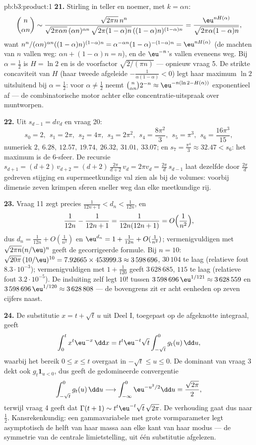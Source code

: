 \begin{solution}{pb:b3:product:1}
\textbf{21.} Stirling in teller en noemer, met $k = \alpha n$:
\[
\binom n{\alpha n} \sim
\frac{\sqrt{2\pi n}\,n^n}
{\sqrt{2\pi\alpha n}\,(\alpha n)^{\alpha n}\,
\sqrt{2\pi(1-\alpha)n}\,((1-\alpha)n)^{(1-\alpha)n}}
= \frac{\eu^{nH(\alpha)}}{\sqrt{2\pi\alpha(1-\alpha)n}},
\]
want $n^n/(\alpha n)^{\alpha n}((1-\alpha)n)^{(1-\alpha)n} =
\alpha^{-\alpha n}(1-\alpha)^{-(1-\alpha)n} = \eu^{nH(\alpha)}$
(de machten van $n$ vallen weg: $\alpha n + (1-\alpha)n = n$), en
de $\eu^{-n}$'s vallen eveneens weg. Bij $\alpha = \frac12$ is $H
= \ln2$ en is de voorfactor $\sqrt{2/(\pi n)}$ --- opnieuw vraag
5. De strikte concaviteit van $H$ (haar tweede afgeleide
$-\frac1{\alpha(1-\alpha)} < 0$) legt haar maximum $\ln 2$
uitsluitend bij $\alpha = \frac12$: voor $\alpha \neq \frac12$
neemt $\binom n{\alpha n}2^{-n} \approx \eu^{-n(\ln2 -
H(\alpha))}$ exponentieel af --- de combinatorische motor achter
elke concentratie-uitspraak over muntworpen.

\textbf{22.} Uit $s_{d-1} = dv_d$ en vraag 20:
\[
s_0 = 2,\ \ s_1 = 2\pi,\ \ s_2 = 4\pi,\ \ s_3 = 2\pi^2,\ \
s_4 = \frac{8\pi^2}3,\ \ s_5 = \pi^3,\ \ s_6 =
\frac{16\pi^3}{15},
\]
numeriek $2,\ 6.28,\ 12.57,\ 19.74,\ 26.32,\ 31.01,\ 33.07$; en
$s_7 = \frac{\pi^4}3 \approx 32.47 < s_6$: het maximum is de
$6$-sfeer. De recursie $s_{d+1} = (d+2)\,v_{d+2} =
(d+2)\,\frac{2\pi}{d+2}\,v_d = 2\pi v_d = \frac{2\pi}d\,s_{d-1}$
laat dezelfde door $\frac{2\pi}d$ gedreven stijging en
supermeetkundige val zien als bij de volumes: voorbij dimensie
zeven krimpen sferen sneller weg dan elke meetkundige rij.

\textbf{23.} Vraag 11 zegt precies $\frac1{12n+1} < d_n <
\frac1{12n}$, en
\[
\frac1{12n} - \frac1{12n+1} = \frac1{12n(12n+1)} =
O\Bigl(\frac1{n^2}\Bigr),
\]
dus $d_n = \frac1{12n} + O(\frac1{n^2})$ en $\eu^{d_n} = 1 +
\frac1{12n} + O(\frac1{n^2})$; vermenigvuldigen met $\sqrt{2\pi
n}(n/\eu)^n$ geeft de gecorrigeerde formule. Bij $n = 10$:
$\sqrt{20\pi}\,(10/\eu)^{10} = 7.92665 \times 453999.3 \approx
3\,598\,696$, $30\,104$ te laag (relatieve fout
$8.3\cdot10^{-3}$); vermenigvuldigen met $1 + \frac1{120}$ geeft
$3\,628\,685$, $115$ te laag (relatieve fout $3.2\cdot10^{-5}$).
De insluiting zelf legt $10!$ tussen $3\,598\,696\,\eu^{1/121}
\approx 3\,628\,559$ en $3\,598\,696\,\eu^{1/120} \approx
3\,628\,808$ --- de bovengrens zit er acht eenheden op zeven
cijfers naast.

\textbf{24.} De substitutie $x = t + \sqrt t\,u$ uit Deel I,
toegepast op de afgeknotte integraal, geeft
\[
\int_0^{t} x^{t}\eu^{-x}\,\dd x
= t^{t}\eu^{-t}\sqrt t\int_{-\sqrt t}^{0} g_t(u)\,\dd u ,
\]
waarbij het bereik $0 \leq x \leq t$ overgaat in $-\sqrt t \leq u
\leq 0$. De dominant van vraag 3 dekt ook $g_t\mathbf 1_{u < 0}$,
dus geeft de gedomineerde convergentie
\[
\int_{-\sqrt t}^{0}g_t(u)\,\dd u \longrightarrow
\int_{-\infty}^{0}\eu^{-u^2/2}\dd u = \frac{\sqrt{2\pi}}2 ,
\]
terwijl vraag 4 geeft dat $\Gamma(t+1) \sim t^t\eu^{-t}\sqrt
t\,\sqrt{2\pi}$. De verhouding gaat dus naar $\frac12$.
Kansrekenkundig: een gammavariabele met grote vormparameter legt
asymptotisch de helft van haar massa aan elke kant van haar modus
--- de symmetrie van de centrale limietstelling, uit één
substitutie afgelezen.


\end{solution}
